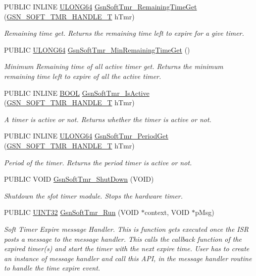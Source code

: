 \begin{DoxyCompactItemize}
PUBLIC INLINE \hyperlink{a00660_ga28961430434ccabca6862ea93fe9a15b}{ULONG64} \hyperlink{a00673_gaa4dc761b52f892e3c5190db7d1bc8eac}{GsnSoftTmr\_\-RemainingTimeGet} (\hyperlink{a00229}{GSN\_\-SOFT\_\-TMR\_\-HANDLE\_\-T} hTmr)
\begin{DoxyCompactList}\small\item\em Remaining time get. Returns the remaining time left to expire for a give timer. \end{DoxyCompactList}\item 
PUBLIC \hyperlink{a00660_ga28961430434ccabca6862ea93fe9a15b}{ULONG64} \hyperlink{a00673_gac722c11a548ed0b5994c9adbc753c28a}{GsnSoftTmr\_\-MinRemainingTimeGet} ()
\begin{DoxyCompactList}\small\item\em Minimum Remaining time of all active timer get. Returns the minimum remaining time left to expire of all the active timer. \end{DoxyCompactList}\item 
PUBLIC INLINE \hyperlink{a00660_ga1f04022c0a182c51c059438790ea138c}{BOOL} \hyperlink{a00673_ga784a1e62206ba30a4f7141e67cdd94ae}{GsnSoftTmr\_\-IsActive} (\hyperlink{a00229}{GSN\_\-SOFT\_\-TMR\_\-HANDLE\_\-T} hTmr)
\begin{DoxyCompactList}\small\item\em A timer is active or not. Returns whether the timer is active or not. \end{DoxyCompactList}\item 
PUBLIC INLINE \hyperlink{a00660_ga28961430434ccabca6862ea93fe9a15b}{ULONG64} \hyperlink{a00673_ga12c97d9f8952a41772dd116afd1cd801}{GsnSoftTmr\_\-PeriodGet} (\hyperlink{a00229}{GSN\_\-SOFT\_\-TMR\_\-HANDLE\_\-T} hTmr)
\begin{DoxyCompactList}\small\item\em Period of the timer. Returns the period timer is active or not. \end{DoxyCompactList}\item 
PUBLIC VOID \hyperlink{a00673_ga9e0fc424d9ba323bca2e72480969fe45}{GsnSoftTmr\_\-ShutDown} (VOID)
\begin{DoxyCompactList}\small\item\em Shutdown the sfot timer module. Stops the hardware timer. \end{DoxyCompactList}\item 
PUBLIC \hyperlink{a00660_gae1e6edbbc26d6fbc71a90190d0266018}{UINT32} \hyperlink{a00673_ga14b04d16861c3ae86cbd69b254e60873}{GsnSoftTmr\_\-Run} (VOID $\ast$context, VOID $\ast$pMsg)
\begin{DoxyCompactList}\small\item\em Soft Timer Expire message Handler. This is function gets executed once the ISR posts a message to the message handler. This calls the callback function of the expired timer(s) and start the timer with the next expire time. User has to create an instance of message handler and call this API, in the message handler routine to handle the time expire event. \end{DoxyCompactList}\end{DoxyCompactItemize}


